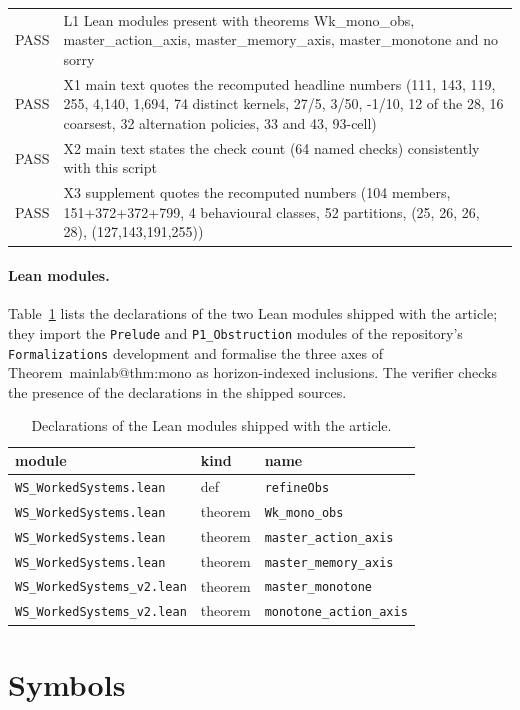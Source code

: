 \documentclass[11pt,a4paper]{article}
\makeatletter
\theoremstyle{plain}
\theoremstyle{definition}
\theoremstyle{remark}
\newcommand{\mref}[1]{\csname mainlab@#1\endcsname}
\makeatother
\begin{document}
\begin{longtable}{lp{}}
PASS & L1 Lean modules present with theorems Wk\_mono\_obs, master\_action\_axis, master\_memory\_axis, master\_monotone and no sorry \\
PASS & X1 main text quotes the recomputed headline numbers (111, 143, 119, 255, 4,140, 1,694, 74 distinct kernels, 27/5, 3/50, -1/10, 12 of the 28, 16 coarsest, 32 alternation policies, 33 and 43, 93-cell) \\
PASS & X2 main text states the check count (64 named checks) consistently with this script \\
PASS & X3 supplement quotes the recomputed numbers (104 members, 151+372+372+799, 4 behavioural classes, 52 partitions, (25, 26, 26, 28), (127,143,191,255)) \\
\end{longtable}

\paragraph{Lean modules.}
Table~\ref{tab:lean} lists the declarations of the two Lean modules shipped with the article; they import the \texttt{Prelude} and \texttt{P1\_Obstruction} modules of the repository's \texttt{Formalizations} development and formalise the three axes of Theorem~\mref{thm:mono} as horizon-indexed inclusions. The verifier checks the presence of the declarations in the shipped sources.

\begin{table}[H]
\centering\small
\caption{Declarations of the Lean modules shipped with the article.}
\label{tab:lean}
\begin{tabular}{lll}
\toprule
module & kind & name \\
\midrule
\texttt{WS\_WorkedSystems.lean} & def & \texttt{refineObs} \\
\texttt{WS\_WorkedSystems.lean} & theorem & \texttt{Wk\_mono\_obs} \\
\texttt{WS\_WorkedSystems.lean} & theorem & \texttt{master\_action\_axis} \\
\texttt{WS\_WorkedSystems.lean} & theorem & \texttt{master\_memory\_axis} \\
\texttt{WS\_WorkedSystems\_v2.lean} & theorem & \texttt{master\_monotone} \\
\texttt{WS\_WorkedSystems\_v2.lean} & theorem & \texttt{monotone\_action\_axis} \\
\bottomrule
\end{tabular}
\end{table}
\section{Symbols}\label{si:symbols}
\end{document}

